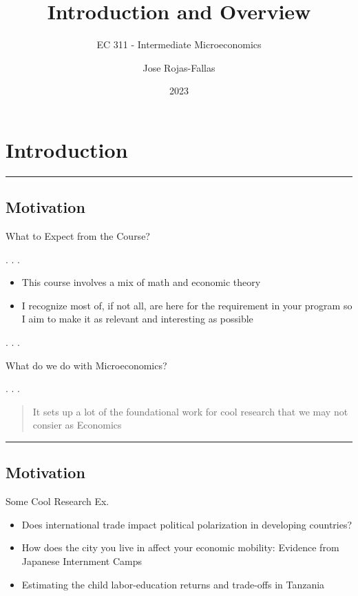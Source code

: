\documentclass[
  letterpaper,
  DIV=11,
  numbers=noendperiod]{scrartcl}
\title{Introduction and Overview}
\subtitle{EC 311 - Intermediate Microeconomics}
\author{Jose Rojas-Fallas}
\date{2023}
\providecommand{\tightlist}{%
  \setlength{\itemsep}{0pt}\setlength{\parskip}{0pt}}\usepackage{longtable,booktabs,array}
\begin{document}
\maketitle
\hypertarget{introduction}{%
\section{Introduction}\label{introduction}}

\begin{center}\rule{0.5\linewidth}{0.5pt}\end{center}

\hypertarget{motivation}{%
\subsection{Motivation}\label{motivation}}

What to Expect from the Course?

. . .

\begin{itemize}
\item
  This course involves a mix of math and economic theory
\item
  I recognize most of, if not all, are here for the requirement in your
  program so I aim to make it as relevant and interesting as possible
\end{itemize}

. . .

What do we do with Microeconomics?

. . .

\begin{quote}
It sets up a lot of the foundational work for cool research that we may
not consier as Economics
\end{quote}

\begin{center}\rule{0.5\linewidth}{0.5pt}\end{center}

\hypertarget{motivation-1}{%
\subsection{Motivation}\label{motivation-1}}

{Some Cool Research Ex.}

\begin{itemize}
\tightlist
\item
  {Does international trade impact political polarization in developing
  countries?}
\item
  {How does the city you live in affect your economic mobility: Evidence
  from Japanese Internment Camps}
\item
  {Estimating the child labor-education returns and trade-offs in
  Tanzania}
\end{itemize}
\end{document}
